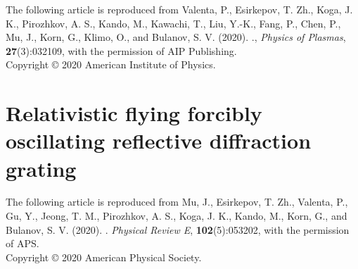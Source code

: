 \documentclass[10pt, twoside, a4paper, openright]{report}
\newcommand{\link}[3][blue]{\href{#2}{\color{#1}{#3}}}%
\begin{document}
The following article is reproduced from Valenta, P., Esirkepov, T. Zh., Koga, J. K., Pirozhkov, A. S., Kando, M., Kawachi, T., Liu, Y.-K., Fang, P., Chen, P., Mu, J., Korn, G., Klimo, O., and Bulanov, S. V. (2020). \link{http://dx.doi.org/10.1063/1.5142084}{Recoil effects on reflection from relativistic mirrors in laser plasmas}., \textit{Physics of Plasmas}, \textbf{27}(3):032109, with the permission of AIP Publishing. \\

\noindent Copyright {\copyright} {2020} {American Institute of Physics}.

\newpage
\mbox{}
\thispagestyle{empty}

\newpage


\section{Relativistic flying forcibly oscillating reflective diffraction grating \label{sec:paper_4}}

The following article is reproduced from Mu, J., Esirkepov, T. Zh., Valenta, P., Gu, Y., Jeong, T. M., Pirozhkov, A. S., Koga, J. K., Kando, M., Korn, G., and Bulanov, S. V. (2020). \link{http://dx.doi.org/10.1103/PhysRevE.102.053202}{Relativistic flying forcibly oscillating reflective diffraction grating}. \textit{Physical Review E}, \textbf{102}(5):053202, with the permission of APS. \\

\noindent Copyright {\copyright} {2020} {American Physical Society}.

\newpage
\mbox{}
\thispagestyle{empty}

\newpage


%

%
\end{document}
